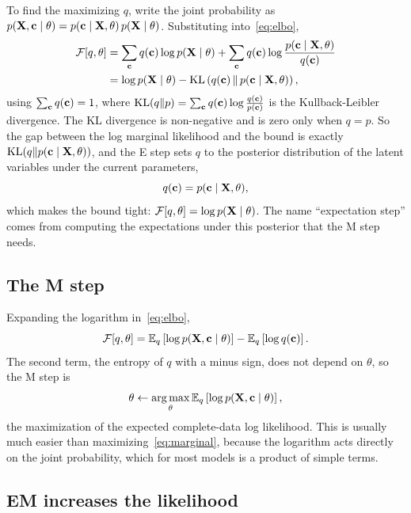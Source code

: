 To find the maximizing $q$, write the joint probability as $p(\mathbf{X},\mathbf{c}\mid\theta)=p(\mathbf{c}\mid\mathbf{X},\theta)\,p(\mathbf{X}\mid\theta)$. Substituting into~\eqref{eq:elbo},
\begin{align}
  \mathcal{F}[q,\theta] &= \sum_{\mathbf{c}}q(\mathbf{c})\log p(\mathbf{X}\mid\theta) + \sum_{\mathbf{c}}q(\mathbf{c})\log\frac{p(\mathbf{c}\mid\mathbf{X},\theta)}{q(\mathbf{c})} \nonumber\\
  &= \log p(\mathbf{X}\mid\theta) - \operatorname{KL}\left(q(\mathbf{c})\,\|\,p(\mathbf{c}\mid\mathbf{X},\theta)\right),
  \label{eq:elbo_kl}
\end{align}
using $\sum_{\mathbf{c}}q(\mathbf{c})=1$, where $\operatorname{KL}(q\|p)=\sum_{\mathbf{c}}q(\mathbf{c})\log\frac{q(\mathbf{c})}{p(\mathbf{c})}$ is the Kullback-Leibler divergence. The KL divergence is non-negative and is zero only when $q=p$. So the gap between the log marginal likelihood and the bound is exactly $\operatorname{KL}(q\|p(\mathbf{c}\mid\mathbf{X},\theta))$, and the E step sets $q$ to the posterior distribution of the latent variables under the current parameters,
\begin{equation}
  q(\mathbf{c}) = p(\mathbf{c}\mid\mathbf{X},\theta),
\end{equation}
which makes the bound tight: $\mathcal{F}[q,\theta]=\log p(\mathbf{X}\mid\theta)$. The name ``expectation step'' comes from computing the expectations under this posterior that the M step needs.

\subsection{The M step}

Expanding the logarithm in~\eqref{eq:elbo},
\begin{equation}
  \mathcal{F}[q,\theta] = \mathbb{E}_q\left[\log p(\mathbf{X},\mathbf{c}\mid\theta)\right] - \mathbb{E}_q\left[\log q(\mathbf{c})\right].
\end{equation}
The second term, the entropy of $q$ with a minus sign, does not depend on $\theta$, so the M step is
\begin{equation}
  \theta \gets \operatorname*{arg\,max}_\theta\mathbb{E}_q\left[\log p(\mathbf{X},\mathbf{c}\mid\theta)\right],
\end{equation}
the maximization of the expected complete-data log likelihood. This is usually much easier than maximizing~\eqref{eq:marginal}, because the logarithm acts directly on the joint probability, which for most models is a product of simple terms.

\subsection{EM increases the likelihood}

